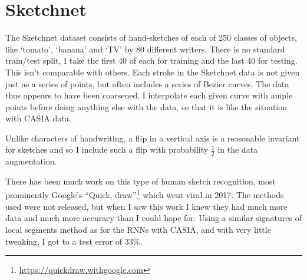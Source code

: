 \section{Sketchnet}
\label{sec:sketch}
The Sketchnet dataset \cite{sketch} consists of hand-sketches of each of 250 classes of objects, like `tomato', `banana' and `TV' by 80 different writers. There is no standard train/test split, I take the first 40 of each for training and the last 40 for testing. This isn't comparable with others. 
Each stroke in the Sketchnet data is not given just as a series of points, but often includes a series of Bezier curves. The data thus appears to have been coarsened. I interpolate each given curve with ample points before doing anything else with the data, so that it is like the situation with CASIA data.

Unlike characters of handwriting, a flip in a vertical axis is a reasonable invariant for sketches and so I include such a flip with probability $\frac12$ in the data augmentation.

There has been much work on this type of human sketch recognition, most prominently Google's ``Quick, draw''\footnote{\url{https://quickdraw.withgoogle.com}} which went viral in 2017. The methods used were not released, but when I saw this work I knew they had much more data and much more accuracy than I could hope for.
Using a similar signatures of local segments method as for the RNNs with CASIA, and with very little tweaking, I got to a test error of 33\%.

